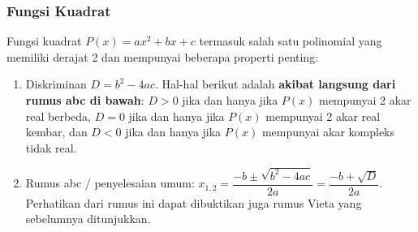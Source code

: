 \subsubsection{Fungsi Kuadrat}
Fungsi kuadrat $P(x)=ax^2+bx+c$ termasuk salah satu polinomial yang memiliki derajat 2 dan mempunyai beberapa properti penting:
\begin{enumerate}
\item Diskriminan $D=b^2-4ac$. Hal-hal berikut adalah \textbf{akibat langsung dari rumus abc di bawah}: $D>0$ jika dan hanya jika $P(x)$ mempunyai 2 akar real berbeda,  $D=0$ jika dan hanya jika $P(x)$ mempunyai 2 akar real kembar, dan $D<0$ jika dan hanya jika $P(x)$ mempunyai akar kompleks tidak real.
\item Rumus abc / penyelesaian umum: $x_{1,2} = \dfrac{-b \pm \sqrt{b^2-4ac}}{2a} = \dfrac{-b+\sqrt{D}}{2a}$. Perhatikan dari rumus ini dapat dibuktikan juga rumus Vieta yang sebelumnya ditunjukkan.
\end{enumerate}